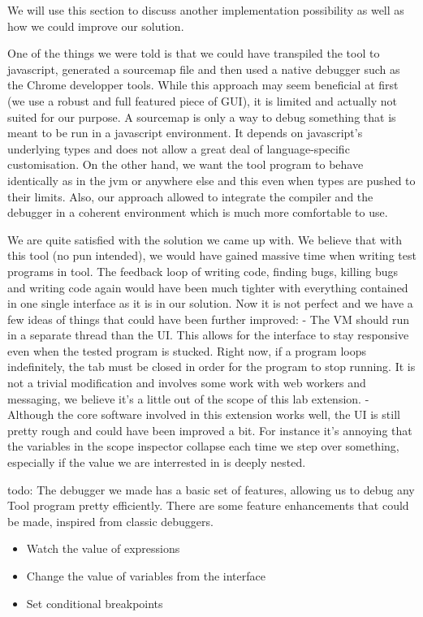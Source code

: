 We will use this section to discuss another implementation possibility as well as how we could improve our solution.

One of the things we were told is that we could have transpiled the tool to javascript, generated a sourcemap file and then used a native debugger such as the Chrome developper tools. While this approach may seem beneficial at first (we use a robust and full featured piece of GUI), it is limited and actually not suited for our purpose. A sourcemap is only a way to debug something that is meant to be run in a javascript environment. It depends on javascript's underlying types and does not allow a great deal of language-specific customisation. On the other hand, we want the tool program to behave identically as in the jvm or anywhere else and this even when types are pushed to their limits. Also, our approach allowed to integrate the compiler and the debugger in a coherent environment which is much more comfortable to use.

We are quite satisfied with the solution we came up with. We believe that with this tool (no pun intended), we would have gained massive time when writing test programs in tool. The feedback loop of writing code, finding bugs, killing bugs and writing code again would have been much tighter with everything contained in one single interface as it is in our solution. Now it is not perfect and we have a few ideas of things that could have been further improved:
- The VM should run in a separate thread than the UI. This allows for the interface to stay responsive even when the tested program is stucked. Right now, if a program loops indefinitely, the tab must be closed in order for the program to stop running. It is not a trivial modification and involves some work with web workers and messaging, we believe it's a little out of the scope of this lab extension.
- Although the core software involved in this extension works well, the UI is still pretty rough and could have been improved a bit. For instance it's annoying that the variables in the scope inspector collapse each time we step over something, especially if the value we are interrested in is deeply nested.

todo:
The debugger we made has a basic set of features, allowing us to debug any Tool program pretty efficiently. There are some feature enhancements that could be made, inspired from classic debuggers.
\begin{itemize}
\item Watch the value of expressions
\item Change the value of variables from the interface
\item Set conditional breakpoints
\end{itemize}
